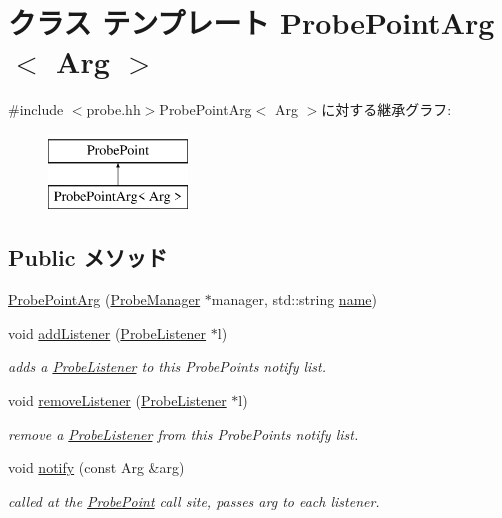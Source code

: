 \hypertarget{classProbePointArg}{
\section{クラス テンプレート ProbePointArg$<$ Arg $>$}
\label{classProbePointArg}
}


{\ttfamily \#include $<$probe.hh$>$}ProbePointArg$<$ Arg $>$に対する継承グラフ:\begin{figure}[H]
\begin{center}
\leavevmode
\includegraphics[height=2cm]{classProbePointArg}
\end{center}
\end{figure}
\subsection*{Public メソッド}
\begin{DoxyCompactItemize}
\item 
\hyperlink{classProbePointArg_a7ccfa6bf8a648c110ae7ec6e360c4e74}{ProbePointArg} (\hyperlink{classProbeManager}{ProbeManager} $\ast$manager, std::string \hyperlink{classProbePoint_ac673bc430bdc3fdaa09f7becf98ef267}{name})
\item 
void \hyperlink{classProbePointArg_ac282f544c73aa50eaed3d43845d122d3}{addListener} (\hyperlink{classProbeListener}{ProbeListener} $\ast$l)
\begin{DoxyCompactList}\small\item\em adds a \hyperlink{classProbeListener}{ProbeListener} to this ProbePoints notify list. \item\end{DoxyCompactList}\item 
void \hyperlink{classProbePointArg_a4b64aec02f5b387eaddd083a3889ca79}{removeListener} (\hyperlink{classProbeListener}{ProbeListener} $\ast$l)
\begin{DoxyCompactList}\small\item\em remove a \hyperlink{classProbeListener}{ProbeListener} from this ProbePoints notify list. \item\end{DoxyCompactList}\item 
void \hyperlink{classProbePointArg_a558191a8c66a37ace08feb713c5d4931}{notify} (const Arg \&arg)
\begin{DoxyCompactList}\small\item\em called at the \hyperlink{classProbePoint}{ProbePoint} call site, passes arg to each listener. \item\end{DoxyCompactList}\end{DoxyCompactItemize}

